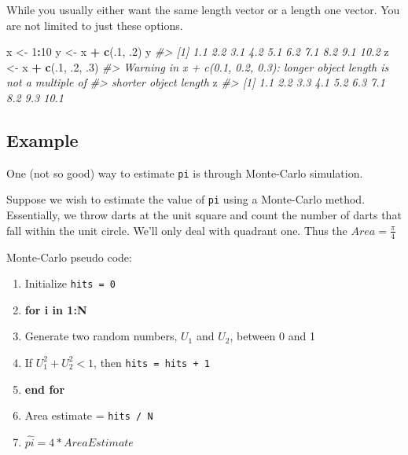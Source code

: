 \documentclass[]{book}
\newenvironment{Shaded}{\begin{snugshade}}{\end{snugshade}}
\newcommand{\KeywordTok}[1]{\textcolor[rgb]{0.13,0.29,0.53}{\textbf{#1}}}
\newcommand{\DecValTok}[1]{\textcolor[rgb]{0.00,0.00,0.81}{#1}}
\newcommand{\StringTok}[1]{\textcolor[rgb]{0.31,0.60,0.02}{#1}}
\newcommand{\CommentTok}[1]{\textcolor[rgb]{0.56,0.35,0.01}{\textit{#1}}}
\newcommand{\OperatorTok}[1]{\textcolor[rgb]{0.81,0.36,0.00}{\textbf{#1}}}
\newcommand{\NormalTok}[1]{#1}
\providecommand{\tightlist}{%
  \setlength{\itemsep}{0pt}\setlength{\parskip}{0pt}}
\theoremstyle{definition}
\theoremstyle{definition}
\theoremstyle{definition}
\theoremstyle{remark}
\begin{document}
While you usually either want the same length vector or a length one
vector. You are not limited to just these options.

\begin{Shaded}
\begin{Highlighting}[]
\NormalTok{x <-}\StringTok{ }\DecValTok{1}\OperatorTok{:}\DecValTok{10}
\NormalTok{y <-}\StringTok{ }\NormalTok{x }\OperatorTok{+}\StringTok{ }\KeywordTok{c}\NormalTok{(.}\DecValTok{1}\NormalTok{, .}\DecValTok{2}\NormalTok{) }
\NormalTok{y}
\CommentTok{#>  [1]  1.1  2.2  3.1  4.2  5.1  6.2  7.1  8.2  9.1 10.2}
\NormalTok{z <-}\StringTok{ }\NormalTok{x }\OperatorTok{+}\StringTok{ }\KeywordTok{c}\NormalTok{(.}\DecValTok{1}\NormalTok{, .}\DecValTok{2}\NormalTok{, .}\DecValTok{3}\NormalTok{)}
\CommentTok{#> Warning in x + c(0.1, 0.2, 0.3): longer object length is not a multiple of}
\CommentTok{#> shorter object length}
\NormalTok{z}
\CommentTok{#>  [1]  1.1  2.2  3.3  4.1  5.2  6.3  7.1  8.2  9.3 10.1}
\end{Highlighting}
\end{Shaded}

\subsection{Example}\label{example}

One (not so good) way to estimate \texttt{pi} is through Monte-Carlo
simulation.

Suppose we wish to estimate the value of \texttt{pi} using a Monte-Carlo
method. Essentially, we throw darts at the unit square and count the
number of darts that fall within the unit circle. We'll only deal with
quadrant one. Thus the \(Area = \frac{\pi}{4}\)

Monte-Carlo pseudo code:

\begin{enumerate}
\def\labelenumi{\arabic{enumi}.}
\tightlist
\item
  Initialize \texttt{hits\ =\ 0}
\item
  \textbf{for i in 1:N}
\item
  Generate two random numbers, \(U_1\) and \(U_2\), between 0 and 1
\item
  If \(U_1^2 + U_2^2 < 1\), then \texttt{hits\ =\ hits\ +\ 1}
\item
  \textbf{end for}
\item
  Area estimate = \texttt{hits\ /\ N}
\item
  \(\hat{pi} = 4 * Area Estimate\)
\end{enumerate}
\end{document}
